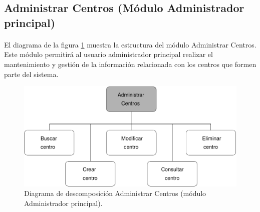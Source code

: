 \subsection{Administrar Centros (Módulo Administrador principal)}

  \paragraph{}El diagrama de la figura
  \ref{diagramaDescomposicionAdministrarCentros} muestra la estructura del módulo
  Administrar Centros. Este módulo permitirá al usuario administrador principal
  realizar el mantenimiento y gestión de la información relacionada con los
  centros que formen parte del sistema.


  \begin{figure}[!ht]
    \begin{center}
      \includegraphics[]{11.Disenyo_Arquitectonico/11.2.Diagramas_Descomposicion/11.2.2.Modulo_administrador_principal/AdministrarBBDD/AdministrarCentros/Diagramas/administrar_centros.pdf}
      \caption{Diagrama de descomposición Administrar Centros (módulo Administrador principal).}
      \label{diagramaDescomposicionAdministrarCentros}
    \end{center}
  \end{figure}
